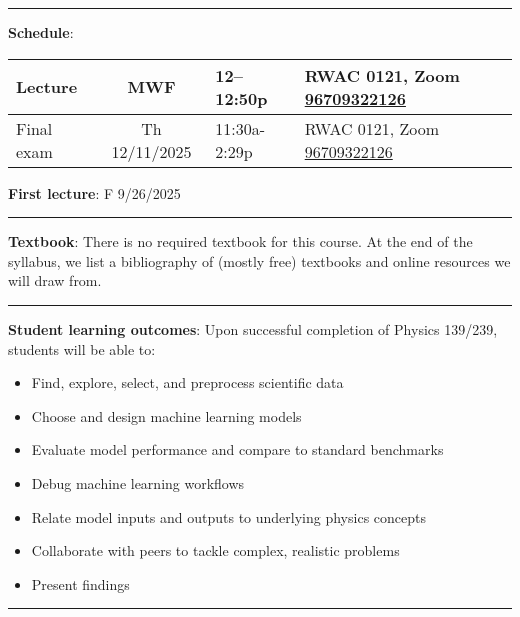 \documentclass[12pt]{article}
\begin{document}
\begin{center}
	\rule{\textwidth}{0.5pt}
\end{center}

\noindent\textbf{Schedule}:
\begin{center}
	\begin{tabular}{|l|c|l|m{60mm}|}
		\hline
		Lecture    & MWF           & 12--12:50p   & RWAC	0121, Zoom \href{https://ucsd.zoom.us/j/96709322126}{96709322126}  \\\hline
		Final exam & Th 12/11/2025 & 11:30a-2:29p & RWAC 0121, Zoom \href{https://ucsd.zoom.us/j/96709322126}{96709322126} \\\hline
	\end{tabular}
\end{center}

\noindent\textbf{First lecture}: F 9/26/2025

\begin{center}
	\rule{\textwidth}{0.5pt}
\end{center}

\noindent\textbf{Textbook}: There is no required textbook for this course.
At the end of the syllabus, we list a bibliography of (mostly free) textbooks and online resources we will draw from.

\begin{center}
	\rule{\textwidth}{0.5pt}
\end{center}

\noindent\textbf{Student learning outcomes}: Upon successful completion of Physics 139/239, students will be able to:
\begin{itemize}
	\itemsep-0.3em
	\item Find, explore, select, and preprocess scientific data
	\item Choose and design machine learning models
	\item Evaluate model performance and compare to standard benchmarks
	\item Debug machine learning workflows
	\item Relate model inputs and outputs to underlying physics concepts
	\item Collaborate with peers to tackle complex, realistic problems
	\item Present findings
\end{itemize}

\begin{center}
	\rule{\textwidth}{0.5pt}
\end{center}
\end{document}
